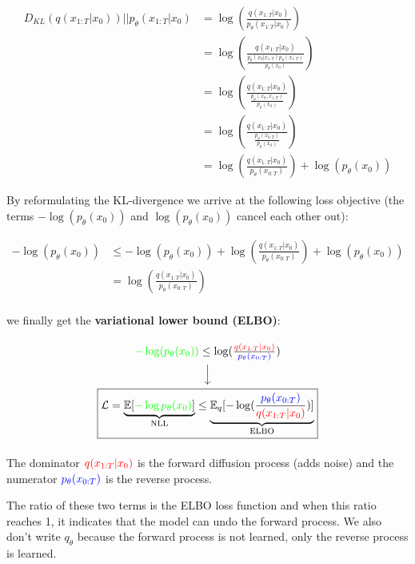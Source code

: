 \begin{align*}
    D_{KL} (q(x_{1:T} | x_0)) \vert \vert p_\theta(x_{1:T} | x_0) &= \log(\frac{q(x_{1:T} | x_0)}{p_\theta(x_{1:T} | x_0)}) \\
    &= \log(\frac{q(x_{1:T} | x_0)}{ \frac{p_\theta(x_0 | x_{1:T}) p_\theta(x_{1:T})}{p_\theta(x_0)} }) \\
    &= \log(\frac{q(x_{1:T} | x_0)}{ \frac{p_\theta(x_0, x_{1:T})}{p_\theta(x_0)} }) \\
    &= \log(\frac{q(x_{1:T} | x_0)}{ \frac{p_\theta(x_{0:T})}{p_\theta(x_0)} }) \\
    &= \log(\frac{q(x_{1:T} | x_0)}{ p_\theta(x_{0:T}) }) + \log(p_\theta(x_0))
\end{align*}

By reformulating the KL-divergence we arrive at the following loss objective (the terms $-\log(p_\theta(x_0))$ and $\log(p_\theta(x_0))$ cancel each other out):

\begin{align*}
    -\log (p_\theta(x_0)) &\leq -\log (p_\theta(x_0)) + \log (\frac{ q(x_{1:T} | x_0) }{ p_\theta (x_{0:T}) }) + \log(p_\theta(x_0)) \\
    &= \log (\frac{ q(x_{1:T} | x_0) }{ p_\theta (x_{0:T}) }) \\
\end{align*}

we finally get the \textbf{variational lower bound (ELBO)}:

\[
\begin{tikzcd}
    \textcolor{green}{-\log(p_\theta(x_0))} \leq \log(\frac{\textcolor{red}{q(x_{1:T} | x_0)}}{\textcolor{blue}{p_\theta(x_{0:T})}})
    \arrow[d, ""] \\
    \boxed{
        \mathcal{L} = 
        \underbrace{\mathbb{E}[
            \textcolor{green}{-\log p_\theta (x_0)}
        ] }_{\text{NLL}}
        \leq 
        \underbrace{\mathbb{E}_q[-\log (\frac{
            \textcolor{blue}{p_\theta(x_{0:T})}
        }{
            \textcolor{red}{q(x_{1:T}|x_0)}})]}_{\text{ELBO}
        }
    }
\end{tikzcd}
\]

The dominator $\textcolor{red}{q(x_{1:T}|x_0)}$ is the forward diffusion process (adds noise) and the numerator $\textcolor{blue}{p_\theta(x_{0:T})}$ is the reverse process. 

The ratio of these two terms is the ELBO loss function and when this ratio reaches 1, it indicates that the model can undo the forward process. We also don't write $q_\theta$ because the forward process is not learned, only the reverse process is learned.

